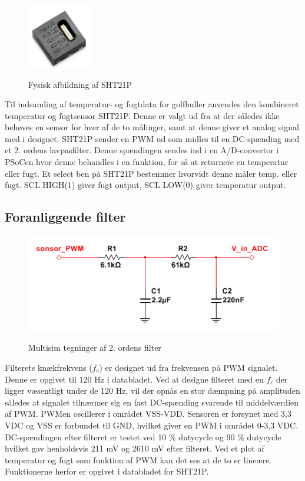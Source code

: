 
\begin{figure}[htb]
\centering
{\includegraphics[width=0.25\textwidth]{filer/design/Billeder/sht21p_fysisk.png}}
\caption{Fysisk afbildning af SHT21P}
\label{lab:sht_filter}
\end{figure}

Til indsamling af temperatur- og fugtdata for golfhuller anvendes den kombineret temperatur og fugtsensor SHT21P. Denne er valgt ud fra at der således ikke behøves en sensor for hver af de to målinger, samt at denne giver et analog signal med i designet. SHT21P sender en PWM ud som midles til en DC-spænding med et 2. ordens lavpasfilter. Denne spændingen sendes ind i en A/D-convertor i PSoCen hvor denne behandles i en funktion, for så at returnere en temperatur eller fugt. Et select ben på SHT21P bestemmer hvorvidt denne måler temp. eller fugt. SCL HIGH(1) giver fugt output, SCL LOW(0) giver temperatur output.

\subsection{Foranliggende filter}
\begin{figure}[htb]
\centering
{\includegraphics{filer/design/Billeder/sht21p_filter_pic.png}}
\caption{Multisim tegninger af 2. ordens filter}
\label{lab:sht_filter_pic}
\end{figure}

Filterets knækfrekvens ($f_c$) er designet ud fra frekvensen på PWM signalet. Denne er opgivet til 120 Hz i databladet. Ved at designe filteret med en $f_c$ der ligger væsentligt under de 120 Hz, vil der opnås en stor dæmpning på amplituden således at signalet tilnærmer sig en fast DC-spænding svarende til middelværdien af PWM. PWMen oscillerer i området VSS-VDD. Sensoren er forsynet med 3,3 VDC og VSS er forbundet til GND, hvilket giver en PWM i området 0-3,3 VDC. DC-spændingen efter filteret er testet ved 10 \% dutycycle og 90 \% dutycycle hvilket gav henholdsvis 211 mV og 2610 mV efter filteret. Ved et plot af temperatur og fugt som funktion af PWM kan det ses at de to er lineære. Funktionerne herfor er opgivet i databladet for SHT21P. 


